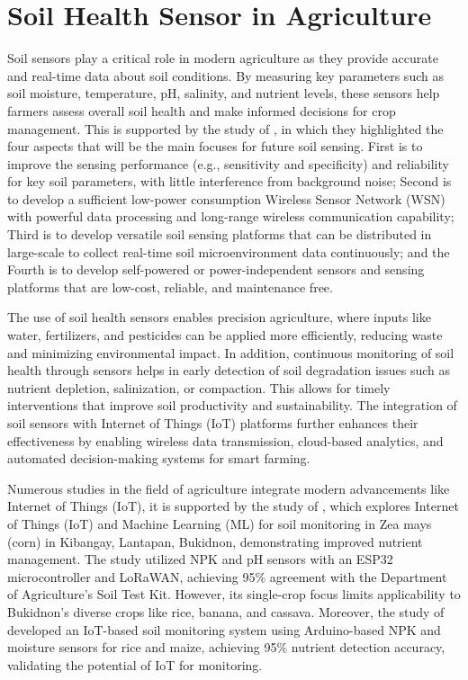 {	\section{Soil Health Sensor in Agriculture}
	Soil sensors play a critical role in modern agriculture as they provide accurate and real-time data about soil conditions. By measuring key parameters such as soil moisture, temperature, pH, salinity, and nutrient levels, these sensors help farmers assess overall soil health and make informed decisions for crop management. This is supported by the study of \cite{Yin2021}, in which they highlighted the four aspects that will be the main focuses for future soil sensing. First is to improve the sensing performance (e.g., sensitivity and specificity) and reliability for key soil parameters, with little interference from background noise; Second is to develop a sufficient low-power consumption Wireless Sensor Network (WSN) with powerful data processing and long-range wireless communication capability; Third is to develop versatile soil sensing platforms that can be distributed in large-scale to collect real-time soil microenvironment data continuously; and the Fourth is to develop self-powered or power-independent sensors and sensing platforms that are low-cost, reliable, and maintenance free.
	
	The use of soil health sensors enables precision agriculture, where inputs like water, fertilizers, and pesticides can be applied more efficiently, reducing waste and minimizing environmental impact. In addition, continuous monitoring of soil health through sensors helps in early detection of soil degradation issues such as nutrient depletion, salinization, or compaction. This allows for timely interventions that improve soil productivity and sustainability. The integration of soil sensors with Internet of Things (IoT) platforms further enhances their effectiveness by enabling wireless data transmission, cloud-based analytics, and automated decision-making systems for smart farming.
	
	Numerous studies in the field of agriculture integrate modern advancements like Internet of Things (IoT), it is supported by the study of \cite{Sondhiya2024}, which explores Internet of Things (IoT) and Machine Learning (ML) for soil monitoring in Zea mays (corn) in Kibangay, Lantapan, Bukidnon, demonstrating improved nutrient management. The study utilized NPK and pH sensors with an ESP32 microcontroller and LoRaWAN, achieving 95\% agreement with the Department of Agriculture’s Soil Test Kit. However, its single-crop focus limits applicability to Bukidnon’s diverse crops like rice, banana, and cassava. Moreover, the study of \cite{Kumar2024} developed an IoT-based soil monitoring system using Arduino-based NPK and moisture sensors for rice and maize, achieving 95\% nutrient detection accuracy, validating the potential of IoT for monitoring.
	
}
